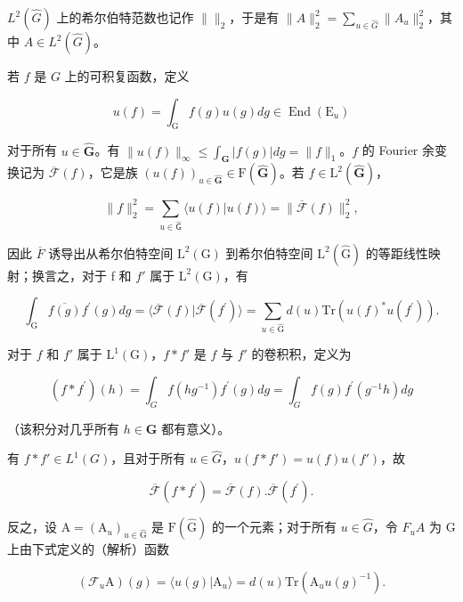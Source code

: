 \(L^{2}(\hat{G})\) 上的希尔伯特范数也记作 \(\parallel\parallel_{2}\)，于是有 \(\|A\|_{2}^{2}=\sum_{u\in\hat{G}}\|A_{u}\|_{2}^{2}\)，其中 \(A\in L^{2}(\hat{G})\)。

若 \(f\) 是 \(G\) 上的可积复函数，定义

\[
u (f) = \int_ {\mathrm{G}} f (g) u (g) d g \in \operatorname{End} (\mathrm{E} _ {u})\tag{6}
\]

对于所有 \(u \in \hat{\mathbf{G}}\)。有 \(\| u(f) \|_{\infty} \leq \int_{\mathbf{G}} |f(g)| dg = \| f \|_1\)。\(f\) 的 Fourier 余变换记为 \(\overline{\mathcal{F}}(f)\)，它是族 \((u(f))_{u \in \hat{\mathbf{G}}} \in \mathrm{F}(\hat{\mathbf{G}})\)。若 \(f \in \mathrm{L}^2(\hat{\mathbf{G}})\)，

\[
\| f \| _ {2} ^ {2} = \sum_ {u \in \hat {\mathsf {G}}} \langle u (f) | u (f) \rangle = \| \overline {{\mathcal {F}}} (f) \| _ {2} ^ {2},
\]

因此 \(\overline{F}\) 诱导出从希尔伯特空间 \(\mathrm{L}^{2}(\mathrm{G})\) 到希尔伯特空间 \(\mathrm{L}^{2}(\hat{\mathrm{G}})\) 的等距线性映射；换言之，对于 f 和 \(f'\) 属于 \(\mathrm{L}^{2}(\mathrm{G})\)，有

\[
\int_ {\mathrm{G}} \overline {{f (g)}} f ^ {\prime} (g) d g = \langle \overline {{\mathcal {F}}} (f) | \overline {{\mathcal {F}}} (f ^ {\prime}) \rangle = \sum_ {u \in \hat {\mathrm{G}}} d (u) \mathrm{Tr} (u (f) ^ {*} u (f ^ {\prime})).\tag{7}
\]

对于 \(f\) 和 \(f'\) 属于 \(\mathrm{L}^1(\mathrm{G})\)，\(f * f'\) 是 \(f\) 与 \(f'\) 的卷积积，定义为

\[
(f * f ^ {\prime}) (h) = \int_ {G} f (h g ^ {- 1}) f ^ {\prime} (g) d g = \int_ {G} f (g) f ^ {\prime} (g ^ {- 1} h) d g
\]

（该积分对几乎所有 \(h \in \mathbf{G}\) 都有意义）。

有 \(f * f' \in L^{1}(G)\)，且对于所有 \(u \in \hat{G}\)，\(u(f * f') = u(f)u(f')\)，故

\[
\overline {{{{\mathcal {F}}}}} (f * f ^ {\prime}) = \overline {{{{\mathcal {F}}}}} (f). \overline {{{{\mathcal {F}}}}} (f ^ {\prime}).\tag{8}
\]

反之，设 \(\mathrm{A} = (\mathrm{A}_{u})_{u \in \hat{\mathrm{G}}}\) 是 \(\mathrm{F}(\hat{\mathrm{G}})\) 的一个元素；对于所有 \(u \in \hat{G}\)，令 \(F_{u}A\) 为 G 上由下式定义的（解析）函数

\[
(\mathcal {F} _ {u} \mathrm{A}) (g) = \langle u (g) | \mathrm{A} _ {u} \rangle = d (u) \mathrm{Tr} (\mathrm{A} _ {u} u (g) ^ {- 1}).\tag{9}
\]

